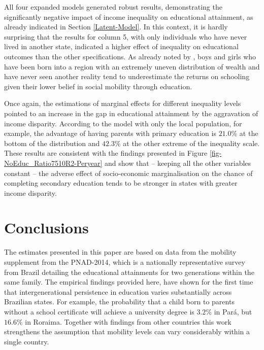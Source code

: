 \documentclass[a4paper, 12pt]{article}
\begin{document}


All four expanded models generated robust results, demonstrating the significantly negative impact of income inequality on educational attainment, as already indicated in Section \ref{Latent-Model}. In this context, it is hardly surprising that the results for column 5, with only individuals who have never lived in another state, indicated a higher effect of inequality on educational outcomes than the other specifications. As already noted by \citet{kearney2014income}, boys and girls who have been born into a region with an extremely uneven distribution of wealth and have never seen another reality tend to underestimate the returns on schooling given their lower belief in social mobility through education.


Once again, the estimations of marginal effects for different inequality levels pointed to an increase in the gap in educational attainment by the aggravation of income disparity. According to the model with only the local population, for example, the advantage of having parents with primary education is $21.0\%$ at the bottom of the distribution and $42.3\%$ at the other extreme of the inequality scale. These results are consistent with the findings presented in Figure \ref{fig-NoEduc_Ratio7510R2-Peryear} and show that – keeping all the other variables constant – the adverse effect of socio-economic marginalisation on the chance of completing secondary education tends to be stronger in states with greater income disparity.








\section{Conclusions} \label{Conclusion}

The estimates presented in this paper are based on data from the mobility supplement from the PNAD-2014, which is a nationally representative survey from Brazil detailing the educational attainments for two generations within the same family. The empirical findings provided here, have shown for the first time that intergenerational persistence in education varies substantially across Brazilian states. For example, the probability that a child born to parents without a school certificate will achieve a university degree is $3.2\%$ in Pará, but $16.6\%$ in Roraima. Together with findings from other countries \citep{chetty2014land, azam2015like, guell2018correlating} this work strengthens the assumption that mobility levels can vary considerably within a single country.
\end{document}
